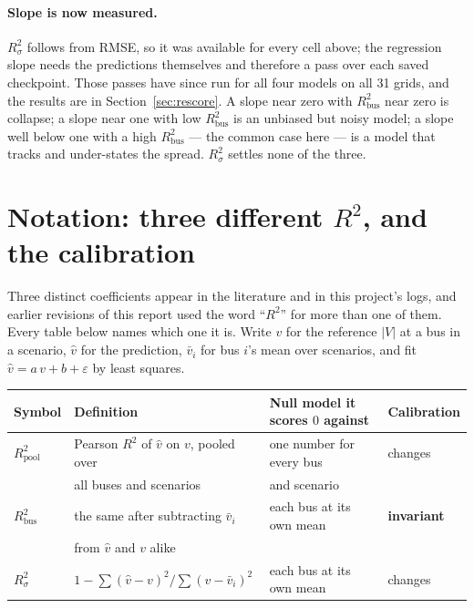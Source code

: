 \documentclass[10pt]{article}
\begin{document}
\paragraph{Slope is now measured.} $R^2_{\sigma}$ follows from RMSE, so it was
available for every cell above; the regression slope needs the predictions
themselves and therefore a pass over each saved checkpoint. Those passes have
since run for all four models on all 31 grids, and the results are in
Section~\ref{sec:rescore}. A slope near zero with $R^2_{\mathrm{bus}}$ near
zero is collapse; a slope near one with low $R^2_{\mathrm{bus}}$ is an unbiased
but noisy model; a slope well below one with a high $R^2_{\mathrm{bus}}$ ---
the common case here --- is a model that tracks and under-states the spread.
$R^2_{\sigma}$ settles none of the three.

\section{Notation: three different $R^2$, and the calibration}
\label{sec:r2notation}

Three distinct coefficients appear in the literature and in this project's
logs, and earlier revisions of this report used the word ``$R^2$'' for more
than one of them.  Every table below names which one it is.  Write $v$ for the
reference $|V|$ at a bus in a scenario, $\hat v$ for the prediction,
$\bar v_i$ for bus $i$'s mean over scenarios, and fit
$\hat v = a\,v + b + \varepsilon$ by least squares.

\begin{table}[H]
\centering\footnotesize
\setlength{\tabcolsep}{4pt}
\begin{tabular}{llll}
\toprule
Symbol & Definition & Null model it scores $0$ against & Calibration\\
\midrule
$R^2_{\mathrm{pool}}$ & Pearson $R^2$ of $\hat v$ on $v$, pooled over
  & one number for every bus & changes\\
  & all buses and scenarios & and scenario & \\[2pt]
$R^2_{\mathrm{bus}}$ & the same after subtracting $\bar v_i$
  & each bus at its own mean & \textbf{invariant}\\
  & from $\hat v$ and $v$ alike & & \\[2pt]
$R^2_{\sigma}$ & $1-\sum(\hat v-v)^2/\sum(v-\bar v_i)^2$
  & each bus at its own mean & changes\\
\bottomrule
\end{tabular}
\end{table}
\end{document}
